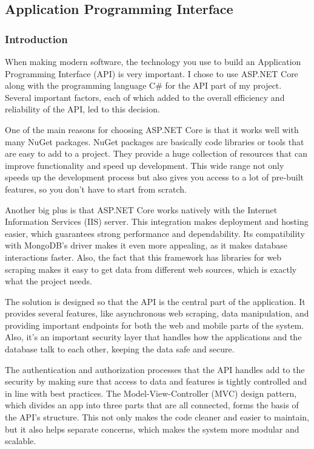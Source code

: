 \newpage

\subsection{Application Programming Interface}

\subsubsection{Introduction}

When making modern software, the technology you use to build an Application Programming Interface (API) is very important. I chose to use ASP.NET Core along with the programming language C\# for the API part of my project. Several important factors, each of which added to the overall efficiency and reliability of the API, led to this decision.

One of the main reasons for choosing ASP.NET Core is that it works well with many NuGet packages. NuGet packages are basically code libraries or tools that are easy to add to a project. They provide a huge collection of resources that can improve functionality and speed up development. This wide range not only speeds up the development process but also gives you access to a lot of pre-built features, so you don't have to start from scratch.

Another big plus is that ASP.NET Core works natively with the Internet Information Services (IIS) server. This integration makes deployment and hosting easier, which guarantees strong performance and dependability. Its compatibility with MongoDB's driver makes it even more appealing, as it makes database interactions faster. Also, the fact that this framework has libraries for web scraping makes it easy to get data from different web sources, which is exactly what the project needs.

The solution is designed so that the API is the central part of the application. It provides several features, like asynchronous web scraping, data manipulation, and providing important endpoints for both the web and mobile parts of the system. Also, it's an important security layer that handles how the applications and the database talk to each other, keeping the data safe and secure.

The authentication and authorization processes that the API handles add to the security by making sure that access to data and features is tightly controlled and in line with best practices. The Model-View-Controller (MVC) design pattern, which divides an app into three parts that are all connected, forms the basis of the API's structure. This not only makes the code cleaner and easier to maintain, but it also helps separate concerns, which makes the system more modular and scalable.

